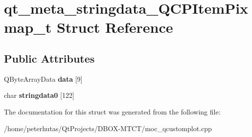 \hypertarget{structqt__meta__stringdata___q_c_p_item_pixmap__t}{}\section{qt\+\_\+meta\+\_\+stringdata\+\_\+\+Q\+C\+P\+Item\+Pixmap\+\_\+t Struct Reference}
\label{structqt__meta__stringdata___q_c_p_item_pixmap__t}
\subsection*{Public Attributes}
\begin{DoxyCompactItemize}
\item 
\mbox{\label{structqt__meta__stringdata___q_c_p_item_pixmap__t_aef8aac1ad1d85c743f42d7ad8159bf41}} 
Q\+Byte\+Array\+Data {\bfseries data} \mbox{[}9\mbox{]}
\item 
\mbox{\label{structqt__meta__stringdata___q_c_p_item_pixmap__t_aea88f01d1b77a98c2d9c3f2c64695c05}} 
char {\bfseries stringdata0} \mbox{[}122\mbox{]}
\end{DoxyCompactItemize}


The documentation for this struct was generated from the following file\+:\begin{DoxyCompactItemize}
\item 
/home/peterhutas/\+Qt\+Projects/\+D\+B\+O\+X-\/\+M\+T\+C\+T/moc\+\_\+qcustomplot.\+cpp\end{DoxyCompactItemize}
